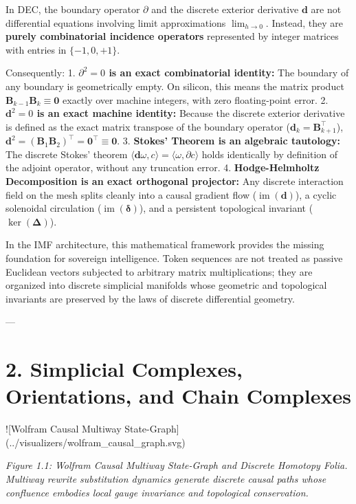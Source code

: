 \documentclass[11pt,twoside,openright]{amsbook}
\begin{document}
In DEC, the boundary operator $\partial$ and the discrete exterior derivative $\mathbf{d}$ are not differential equations involving limit approximations $\lim_{h \to 0}$. Instead, they are \textbf{purely combinatorial incidence operators} represented by integer matrices with entries in $\{-1, 0, +1\}$. 

Consequently:
1. \textbf{$\partial^2 = 0$ is an exact combinatorial identity:} The boundary of any boundary is geometrically empty. On silicon, this means the matrix product $\mathbf{B}_{k-1} \mathbf{B}_k \equiv \mathbf{0}$ exactly over machine integers, with zero floating-point error.
2. \textbf{$\mathbf{d}^2 = 0$ is an exact machine identity:} Because the discrete exterior derivative is defined as the exact matrix transpose of the boundary operator ($\mathbf{d}_k = \mathbf{B}_{k+1}^\top$), $\mathbf{d}^2 = (\mathbf{B}_1 \mathbf{B}_2)^\top = \mathbf{0}^\top \equiv \mathbf{0}$.
3. \textbf{Stokes' Theorem is an algebraic tautology:} The discrete Stokes' theorem $\langle \mathbf{d}\omega, c \rangle = \langle \omega, \partial c \rangle$ holds identically by definition of the adjoint operator, without any truncation error.
4. \textbf{Hodge-Helmholtz Decomposition is an exact orthogonal projector:} Any discrete interaction field on the mesh splits cleanly into a causal gradient flow ($\operatorname{im}(\mathbf{d})$), a cyclic solenoidal circulation ($\operatorname{im}(\boldsymbol{\delta})$), and a persistent topological invariant ($\ker(\boldsymbol{\Delta})$).

In the IMF architecture, this mathematical framework provides the missing foundation for sovereign intelligence. Token sequences are not treated as passive Euclidean vectors subjected to arbitrary matrix multiplications; they are organized into discrete simplicial manifolds whose geometric and topological invariants are preserved by the laws of discrete differential geometry.

---


\section{2. Simplicial Complexes, Orientations, and Chain Complexes}

![Wolfram Causal Multiway State-Graph](../visualizers/wolfram_causal_graph.svg)

\textit{Figure 1.1: Wolfram Causal Multiway State-Graph and Discrete Homotopy Folia. Multiway rewrite substitution dynamics generate discrete causal paths whose confluence embodies local gauge invariance and topological conservation.}
\end{document}
